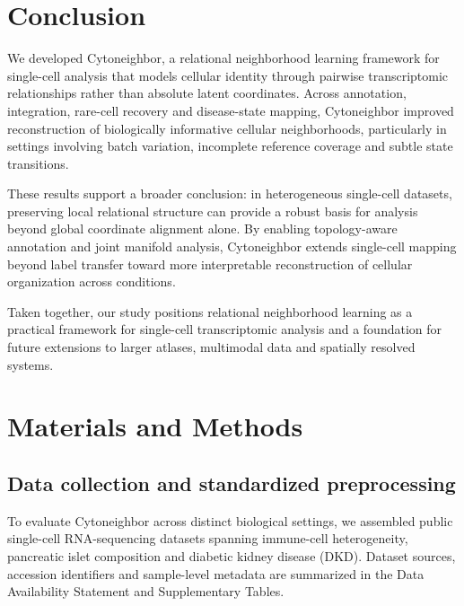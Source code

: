 \documentclass[11pt]{article}
\begin{document}
\section{Conclusion}

We developed Cytoneighbor, a relational neighborhood learning framework for single-cell analysis that models cellular identity through pairwise transcriptomic relationships rather than absolute latent coordinates. Across annotation, integration, rare-cell recovery and disease-state mapping, Cytoneighbor improved reconstruction of biologically informative cellular neighborhoods, particularly in settings involving batch variation, incomplete reference coverage and subtle state transitions.

These results support a broader conclusion: in heterogeneous single-cell datasets, preserving local relational structure can provide a robust basis for analysis beyond global coordinate alignment alone. By enabling topology-aware annotation and joint manifold analysis, Cytoneighbor extends single-cell mapping beyond label transfer toward more interpretable reconstruction of cellular organization across conditions.

Taken together, our study positions relational neighborhood learning as a practical framework for single-cell transcriptomic analysis and a foundation for future extensions to larger atlases, multimodal data and spatially resolved systems.



\section{Materials and Methods}

\subsection{Data collection and standardized preprocessing}

To evaluate Cytoneighbor across distinct biological settings, we assembled public single-cell RNA-sequencing datasets spanning immune-cell heterogeneity, pancreatic islet composition and diabetic kidney disease (DKD)\cite{Villani2017Immune,Muraro2016Pancreas,Baron2016Pancreas,Segerstolpe2016Pancreas,Xin2016Pancreas,Lawlor2017Pancreas,Wilson2022DKD,Chen2023DKDSpatial,Lake2023KidneyAtlas}. Dataset sources, accession identifiers and sample-level metadata are summarized in the Data Availability Statement and Supplementary Tables.
\end{document}
